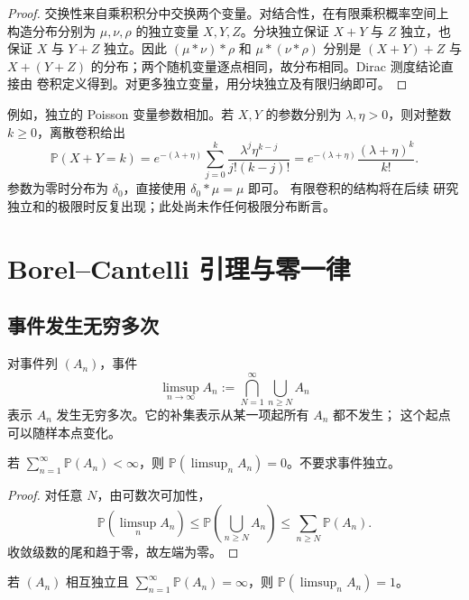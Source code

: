 \begin{proof}
交换性来自乘积积分中交换两个变量。对结合性，在有限乘积概率空间上
构造分布分别为 $\mu,\nu,\rho$ 的独立变量 $X,Y,Z$。分块独立保证
$X+Y$ 与 $Z$ 独立，也保证 $X$ 与 $Y+Z$ 独立。因此
$(\mu*\nu)*\rho$ 和 $\mu*(\nu*\rho)$ 分别是 $(X+Y)+Z$ 与 $X+(Y+Z)$
的分布；两个随机变量逐点相同，故分布相同。Dirac 测度结论直接由
卷积定义得到。对更多独立变量，用分块独立及有限归纳即可。
\end{proof}

例如，独立的 Poisson 变量参数相加。若 $X,Y$ 的参数分别为
$\lambda,\eta>0$，则对整数 $k\ge0$，离散卷积给出
\[
 \mathbb P(X+Y=k)
 =e^{-(\lambda+\eta)}\sum_{j=0}^k\frac{\lambda^j\eta^{k-j}}{j!(k-j)!}
 =e^{-(\lambda+\eta)}\frac{(\lambda+\eta)^k}{k!}.
\]
参数为零时分布为 $\delta_0$，直接使用 $\delta_0*\mu=\mu$ 即可。
有限卷积的结构将在后续
研究独立和的极限时反复出现；此处尚未作任何极限分布断言。

\section{Borel--Cantelli 引理与零一律}
\label{sec:borel-cantelli-zero-one}

\subsection{事件发生无穷多次}

对事件列 $(A_n)$，事件
\[
 \limsup_{n\to\infty}A_n
 :=\bigcap_{N=1}^{\infty}\bigcup_{n\ge N}A_n
\]
表示 $A_n$ 发生无穷多次。它的补集表示从某一项起所有 $A_n$ 都不发生；
这个起点可以随样本点变化。

\begin{theorem}
\label{thm:borel-cantelli-first}
若 $\sum_{n=1}^{\infty}\mathbb P(A_n)<\infty$，则
$\mathbb P(\limsup_nA_n)=0$。不要求事件独立。
\end{theorem}

\begin{proof}
对任意 $N$，由可数次可加性，
\[
 \mathbb P(\limsup_nA_n)
 \le\mathbb P\left(\bigcup_{n\ge N}A_n\right)
 \le\sum_{n\ge N}\mathbb P(A_n).
\]
收敛级数的尾和趋于零，故左端为零。
\end{proof}

\begin{theorem}
\label{thm:borel-cantelli-second}
若 $(A_n)$ 相互独立且 $\sum_{n=1}^{\infty}\mathbb P(A_n)=\infty$，则
$\mathbb P(\limsup_nA_n)=1$。
\end{theorem}

